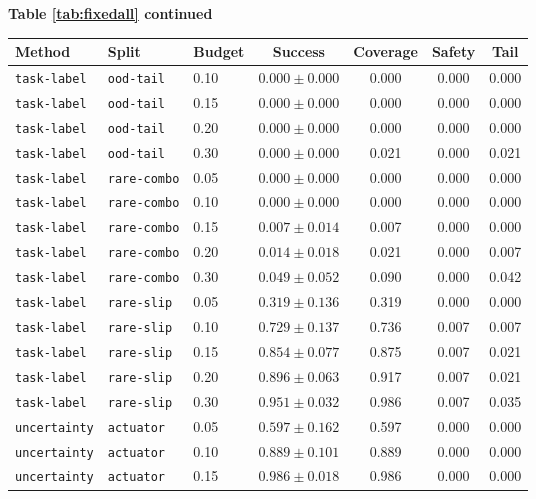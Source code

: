 \documentclass{article}
\begin{document}
\begin{center}
\textbf{Table \ref{tab:fixedall} continued}\\[0.4ex]
\begin{tabular}{lllcccc}
\toprule
Method & Split & Budget & Success & Coverage & Safety & Tail \\
\midrule
\texttt{task-label} & \texttt{ood-tail} & 0.10 & $0.000 \pm 0.000$ & 0.000 & 0.000 & 0.000 \\
\texttt{task-label} & \texttt{ood-tail} & 0.15 & $0.000 \pm 0.000$ & 0.000 & 0.000 & 0.000 \\
\texttt{task-label} & \texttt{ood-tail} & 0.20 & $0.000 \pm 0.000$ & 0.000 & 0.000 & 0.000 \\
\texttt{task-label} & \texttt{ood-tail} & 0.30 & $0.000 \pm 0.000$ & 0.021 & 0.000 & 0.021 \\
\texttt{task-label} & \texttt{rare-combo} & 0.05 & $0.000 \pm 0.000$ & 0.000 & 0.000 & 0.000 \\
\texttt{task-label} & \texttt{rare-combo} & 0.10 & $0.000 \pm 0.000$ & 0.000 & 0.000 & 0.000 \\
\texttt{task-label} & \texttt{rare-combo} & 0.15 & $0.007 \pm 0.014$ & 0.007 & 0.000 & 0.000 \\
\texttt{task-label} & \texttt{rare-combo} & 0.20 & $0.014 \pm 0.018$ & 0.021 & 0.000 & 0.007 \\
\texttt{task-label} & \texttt{rare-combo} & 0.30 & $0.049 \pm 0.052$ & 0.090 & 0.000 & 0.042 \\
\texttt{task-label} & \texttt{rare-slip} & 0.05 & $0.319 \pm 0.136$ & 0.319 & 0.000 & 0.000 \\
\texttt{task-label} & \texttt{rare-slip} & 0.10 & $0.729 \pm 0.137$ & 0.736 & 0.007 & 0.007 \\
\texttt{task-label} & \texttt{rare-slip} & 0.15 & $0.854 \pm 0.077$ & 0.875 & 0.007 & 0.021 \\
\texttt{task-label} & \texttt{rare-slip} & 0.20 & $0.896 \pm 0.063$ & 0.917 & 0.007 & 0.021 \\
\texttt{task-label} & \texttt{rare-slip} & 0.30 & $0.951 \pm 0.032$ & 0.986 & 0.007 & 0.035 \\
\texttt{uncertainty} & \texttt{actuator} & 0.05 & $0.597 \pm 0.162$ & 0.597 & 0.000 & 0.000 \\
\texttt{uncertainty} & \texttt{actuator} & 0.10 & $0.889 \pm 0.101$ & 0.889 & 0.000 & 0.000 \\
\texttt{uncertainty} & \texttt{actuator} & 0.15 & $0.986 \pm 0.018$ & 0.986 & 0.000 & 0.000 \\

\end{tabular}
\end{center}
\end{document}
